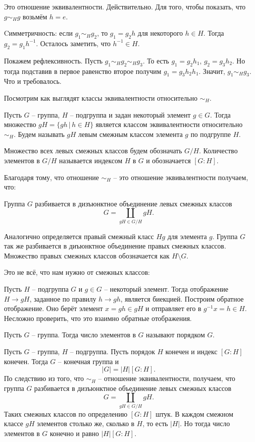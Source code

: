\utv Это отношение эквивалентности.
\eutv
\proof Действительно. Для того, чтобы показать, что $g\sim_H g$ возьмём $h=e$. 

Cимметричность: если $g_1 \sim_H g_2$, то $g_1=g_2h$ для некоторого $h\in H$. Тогда $g_2=g_1h^{-1}$. Осталось заметить, что $h^{-1}\in H$.

Покажем рефлексивность. Пусть $g_1\sim_H g_2 \sim_H g_3$.  То есть $g_1=g_2h_1$, $g_2=g_3h_2$. Но тогда подставив в первое равенство второе получим $g_1=g_3h_2h_1$. Значит, $g_1\sim_H g_3$. Что и требовалось. 
\endproof

Посмотрим как выглядят классы эквивалентности относительно $\sim_H$.

\dfn Пусть $G$ -- группа, $H$ -- подгруппа и задан некоторый элемент $g\in G$. Тогда множество $gH=\{ gh\,|\, h \in H\}$ является классом эквивалентности относительно $\sim_H$. Будем называть $gH$ левым смежным  классом элемента $g$ по подгруппе $H$. 
\edfn

\dfn Множество всех левых смежных классов будем обозначать $G/H$. Количество элементов в $G/H$ называется индексом $H$ в $G$  и обозначается $[G:H]$. 
\edfn

Благодаря тому, что отношение $\sim_H$ -- это отношение эквивалентности получаем, что:


\crl Группа $G$ разбивается в дизъюнктное объединение левых смежных классов $$G=\coprod_{ gH \in G/H} gH.$$
\ecrl




\rm Аналогично определяется правый смежный класс $Hg$ для элемента $g$. Группа $G$ так же разбивается в диъюнктное объединение правых смежных классов. Множество правых смежных классов обозначается как $H\setminus G$.
\erm 

Это не всё, что нам нужно от смежных классов:

\utv Пусть $H$ -- подгруппа $G$ и $g\in G$ -- некоторый элемент. Тогда отображение $H \to gH$, заданное по правилу $h \to gh$, является биекцией.
\eutv
\proof Построим обратное отображение. Оно берёт элемент $x=gh\in gH$ и отправляет его в $g^{-1}x=h \in H $. Несложно проверить, что это взаимно обратные отображения.
\endproof

\dfn Пусть $G$ -- группа. Тогда число элементов в $G$ называют порядком $G$.
\edfn

\thrm[Лагранжа]  Пусть $G$ -- группа, $H$ -- подгруппа. Пусть порядок  $H$ конечен и индекс $[G:H]$ конечен. Тогда $G$ -- конечная группа и 
 $$|G|=|H|[G:H].$$
\ethrm
\proof По следствию из того, что $\sim_H$ -- отношение эквивалентности, получаем, что группа $G$ разбивается в дизъюнктное объединение левых смежных классов $$G=\coprod_{gH \in G/H} gH.$$
Таких смежных классов по определению $[G:H]$ штук. В каждом смежном классе $gH$ элементов столько же, сколько в $H$, то есть $|H|$. Но тогда число элементов в $G$ конечно и равно $|H|[G:H]$.
\endproof

